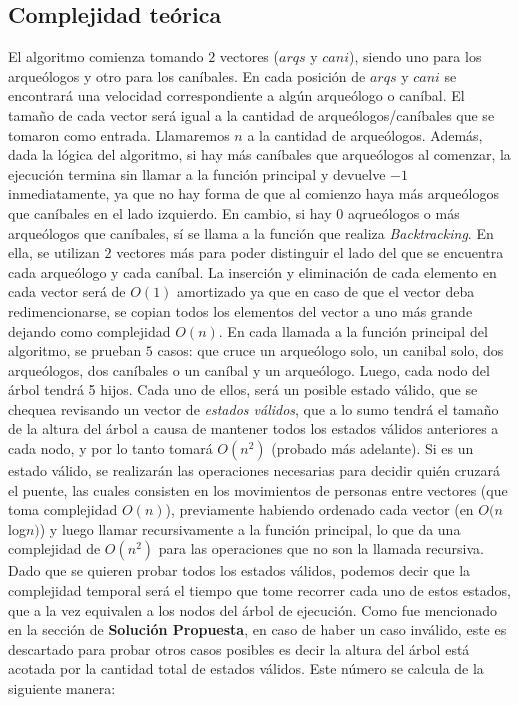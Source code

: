     \subsection{Complejidad teórica}

      El algoritmo comienza tomando $2$ vectores ($arqs$ y $cani$), siendo uno para los arqueólogos y otro para los caníbales. En cada posición de $arqs$ y $cani$ se encontrará una velocidad correspondiente a algún arqueólogo o caníbal. El tamaño de cada vector será igual a la cantidad de arqueólogos/caníbales que se tomaron como entrada. Llamaremos $n$ a la cantidad de arqueólogos. Además, dada la lógica del algoritmo, si hay más caníbales que arqueólogos al comenzar, la ejecución termina sin llamar a la función principal y devuelve $-1$ inmediatamente, ya que no hay forma de que al comienzo haya más arqueólogos que caníbales en el lado izquierdo. En cambio, si hay $0$ aqrueólogos o más arqueólogos que caníbales, sí se llama a la función que realiza \emph{Backtracking}.
      En ella, se utilizan $2$ vectores más para poder distinguir el lado del que se encuentra cada arqueólogo y cada caníbal. La inserción y eliminación de cada elemento en cada vector será de $O(1)$ amortizado ya que en caso de que el vector deba redimencionarse, se copian todos los elementos del vector a uno más grande dejando como complejidad $O(n)$.
      En cada llamada a la función principal del algoritmo, se prueban $5$ casos: que cruce un arqueólogo solo, un canibal solo, dos arqueólogos, dos caníbales o un caníbal y un arqueólogo. Luego, cada nodo del árbol tendrá 5 hijos. Cada uno de ellos, será un posible estado válido, que se chequea revisando un vector de \emph{estados válidos}, que a lo sumo tendrá el tamaño de la altura del árbol a causa de mantener todos los estados válidos anteriores a cada nodo, y por lo tanto tomará $O(n^2)$ (probado más adelante). Si es un estado válido, se realizarán las operaciones necesarias para decidir quién cruzará el puente, las cuales consisten en los movimientos de personas entre vectores (que toma complejidad $O(n)$), previamente habiendo ordenado cada vector (en $O(n $log$ n)$) y luego llamar recursivamente a la función principal, lo que da una complejidad de $O(n^2)$ para las operaciones que no son la llamada recursiva. Dado que se quieren probar todos los estados válidos, podemos decir que la complejidad temporal será el tiempo que tome recorrer cada uno de estos estados, que a la vez equivalen a los nodos del árbol de ejecución. Como fue mencionado en la sección de \textbf{Solución Propuesta}, en caso de haber un caso inválido, este es descartado para probar otros casos posibles es decir la altura del árbol está acotada por la cantidad total de estados válidos. Este número se calcula de la siguiente manera:

